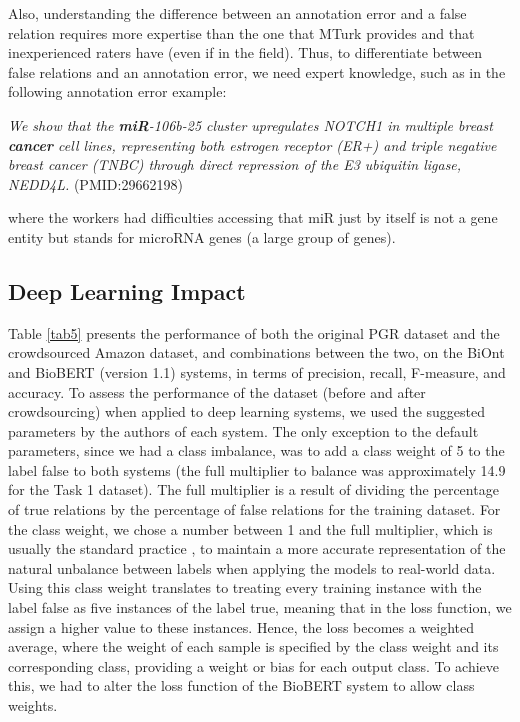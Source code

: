 Also, understanding the difference between an annotation error and a false relation requires more expertise than the one that MTurk provides and that inexperienced raters have (even if in the field). Thus, to differentiate between false relations and an annotation error, we need expert knowledge, such as in the following annotation error example:

\textit{We show that the \textbf{miR}-106b-25 cluster upregulates NOTCH1 in multiple breast \textbf{cancer} cell lines, representing both estrogen receptor (ER+) and triple negative breast cancer (TNBC) through direct repression of the E3 ubiquitin ligase, NEDD4L.} (PMID:29662198)

where the workers had difficulties accessing that miR just by itself is not a gene entity but stands for microRNA genes (a large group of genes).

\subsection{Deep Learning Impact}

Table \ref{tab5} presents the performance of both the original PGR dataset and the crowdsourced Amazon dataset, and combinations between the two, on the BiOnt \citep{sousa2020biont} and BioBERT (version 1.1) \citep{lee2020biobert} systems, in terms of precision, recall, F-measure, and accuracy. To assess the performance of the dataset (before and after crowdsourcing) when applied to deep learning systems, we used the suggested parameters by the authors of each system. The only exception to the default parameters, since we had a class imbalance, was to add a class weight of 5 to the label false to both systems (the full multiplier to balance was approximately 14.9 for the Task 1 dataset). The full multiplier is a result of dividing the percentage of true relations by the percentage of false relations for the training dataset. For the class weight, we chose a number between 1 and the full multiplier, which is usually the standard practice \citep{chen2018efficient}, to maintain a more accurate representation of the natural unbalance between labels when applying the models to real-world data. Using this class weight translates to treating every training instance with the label false as five instances of the label true, meaning that in the loss function, we assign a higher value to these instances. Hence, the loss becomes a weighted average, where the weight of each sample is specified by the class weight and its corresponding class, providing a weight or bias for each output class. To achieve this, we had to alter the loss function of the BioBERT system to allow class weights.

